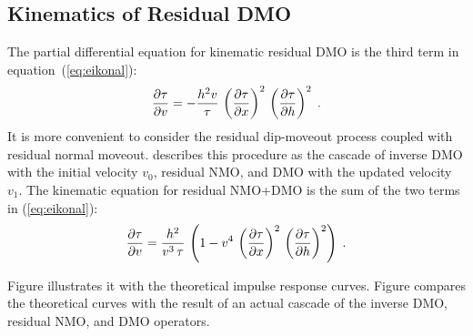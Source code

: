 \subsection{Kinematics of Residual DMO}   
The partial differential equation for kinematic residual DMO is the
third term in equation~(\ref{eq:eikonal}):
\begin{equation}
{{\partial \tau} \over {\partial v}} = 
- {{h^2 v} \over {\tau}}\,
\left({{\partial \tau} \over {\partial x}}\right)^2\,
\left({{\partial \tau} \over {\partial h}}\right)^2\;.
\label{eq:ResDMOeikonal} 
\end{equation}
It is more convenient to consider the residual dip-moveout process
coupled with residual normal moveout. \cite{Etgen.sepphd.68} describes
this procedure as the cascade of inverse DMO with the initial velocity
$v_0$, residual NMO, and DMO with the updated velocity $v_1$. The
kinematic equation for residual NMO+DMO is the sum of the two terms in
(\ref{eq:eikonal}):
\begin{equation}
{{\partial \tau} \over {\partial v}} = 
{{h^2} \over {v^3\,\tau}}\,\left(1-v^4\,
\left({{\partial \tau} \over {\partial x}}\right)^2\,
\left({{\partial \tau} \over {\partial h}}\right)^2\right)\;.
\label{eq:DMONMOeikonal} 
\end{equation}
\begin{comment}
If the boundary data for equation (\ref{eq:DMONMOeikonal}) are on a
common-offset gather, it is appropriate to rewrite this equation
purely in terms of the midpoint derivative ${{\partial \tau} \over
{\partial x}}$, eliminating the offset-derivative term ${{\partial
\tau} \over {\partial h}}$. The resultant expression, derived in
Appendix A, has the form
\begin{equation}
v^3\,{{\partial \tau} \over {\partial v}} = 
{{2\,h^2} \over
{\sqrt{\tau^2 + 4\,h^2\,
Q\left(v,{{\partial \tau} \over {\partial x}}\right)} + \tau}}\;,
\label{eq:noth} 
\end{equation}
where 
\begin{equation}
Q(v,\tau_x) = {{\tau_x^2} \over 
{\left(1 + v^2\,\tau_x^2\right)^2}}\;.   
\label{eq:qtx} 
\end{equation}
\end{comment}

  Figure  illustrates it with the
theoretical impulse response curves. Figure  compares the
theoretical curves with the result of an actual cascade of the inverse
DMO, residual NMO, and DMO operators.

